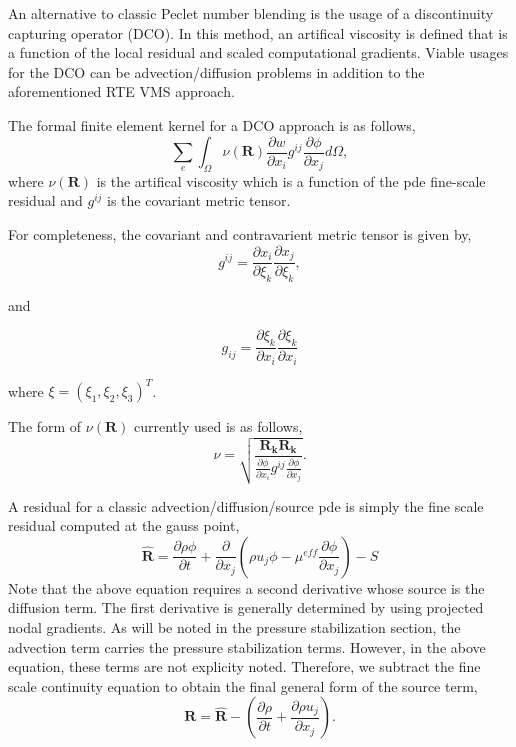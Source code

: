 An alternative to classic Peclet number blending is the usage of a discontinuity capturing operator (DCO).
In this method, an artifical viscosity is defined that is a function of the local residual and scaled computational 
gradients. Viable usages for the DCO can be advection/diffusion problems in addition to the aforementioned RTE
VMS approach.

The formal finite element kernel for a DCO approach is as follows,
\begin{equation}
  \sum_e \int_\Omega \nu(\mathbf{R}) \frac{\partial w}{\partial x_i} g^{ij} \frac{\partial \phi} {\partial x_j} d\Omega,
\label{dcoFEMForm}
\end{equation}
where $\nu(\mathbf{R})$ is the artifical viscosity which is a function of the pde fine-scale residual and $g^{ij}$ is the covariant
metric tensor.

For completeness, the covariant and contravarient metric tensor is given by,
\begin{equation}
  g^{ij} = \frac{\partial x_i} {\partial \xi_k}\frac{\partial x_j} {\partial \xi_k},
\label{coVariant}
\end{equation}

 and

\begin{equation}
  g_{ij} = \frac{\partial \xi_k} {\partial x_i} \frac{\partial \xi_k} {\partial x_i}
\label{coVariant}
\end{equation}

where $\xi = (\xi_1, \xi_2, \xi_3)^T$.

The form of $\nu(\mathbf{R})$ currently used is as follows,
\begin{equation}
  \nu = \sqrt{ \frac{\mathbf{R_k} \mathbf{R_k}} {\frac {\partial \phi}{\partial x_i} g^{ij} \frac{\partial \phi}{\partial x_j}} }.
\label{nuOne}
\end{equation}

A residual for a classic advection/diffusion/source pde is simply the fine scale residual computed at the gauss point,
\begin{equation}
 \mathbf{\hat R} = \frac{\partial \rho \phi}{\partial t} + \frac{\partial}{\partial x_j} (\rho u_j \phi - \mu^{eff} \frac{\partial \phi}{\partial x_j}) -S
 \label{dcoResidual}
\end{equation}
Note that the above equation requires a second derivative whose source is the diffusion term. The first derivative is generally determined
by using projected nodal gradients. As will be noted in the pressure stabilization section, the advection term carries the pressure
stabilization terms. However, in the above equation, these terms are not explicity noted. Therefore, we subtract the fine scale continuity
equation to obtain the final general form of the source term,
\begin{equation}
 \mathbf{R} = \mathbf{\hat R} -  (\frac{\partial \rho}{\partial t} + \frac{\partial \rho u_j }{\partial x_j}).
 \label{dcoResidual}
\end{equation}

